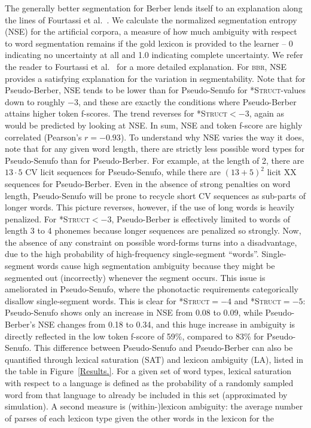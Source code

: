 \documentclass[11pt]{article}
\begin{document}
The generally better segmentation for Berber lends itself to an explanation along the lines of Fourtassi et al.~. We calculate the normalized segmentation entropy (NSE) for the artificial corpora, a measure of how much ambiguity with respect to word segmentation remains if the gold lexicon is provided to the learner -- 0 indicating no uncertainty at all and 1.0 indicating complete uncertainty. We refer the reader to Fourtassi et al.~ for a more detailed explanation. For \textsc{bbr}, NSE provides a satisfying explanation for the variation in segmentability. Note that for Pseudo-Berber, NSE tends to be lower than for Pseudo-Senufo for \textsc{*Struct}-values down to roughly $-3$, and these are exactly the conditions where Pseudo-Berber attains higher token f-scores. The trend reverses for \textsc{*Struct}$<-3$, again as would be predicted by looking at NSE. In sum, NSE and token f-score are highly correlated (Pearson's $r = -0.93$). To understand why NSE varies the way it does, note that for any given word length, there are strictly less possible word types for Pseudo-Senufo than for Pseudo-Berber. For example, at the length of 2, there are $13 \cdot 5$ CV licit sequences for Pseudo-Senufo, while there are $(13+5)^2$ licit XX sequences for Pseudo-Berber. Even in the absence of strong penalties on word length, Pseudo-Senufo will be prone to recycle short CV sequences as sub-parts of longer words. This picture reverses, however, if the use of long words is heavily penalized. For \textsc{*Struct}$< -3$, Pseudo-Berber is effectively limited to words of length 3 to 4 phonemes because longer sequences are penalized so strongly. Now, the absence of any constraint on possible word-forms turns into a disadvantage, due to the high probability of high-frequency single-segment ``words''. Single-segment words cause high segmentation ambiguity because they might be segmented out (incorrectly) whenever the segment occurs. This issue is ameliorated in Pseudo-Senufo, where the phonotactic requirements categorically disallow single-segment words. This is clear for \textsc{*Struct}$= -4$ and \textsc{*Struct}$= -5$: Pseudo-Senufo shows only an increase in NSE from 0.08 to 0.09, while Pseudo-Berber's NSE changes from 0.18 to 0.34, and this huge increase in ambiguity is directly reflected in the low token f-score of 59\%, compared to 83\% for Pseudo-Senufo. This difference between Pseudo-Senufo and Pseudo-Berber can also be quantified through lexical saturation (SAT) and lexicon ambiguity (LA), listed in the table in Figure~\ref{Results.}. For a given set of word types, lexical saturation with respect to a language is defined as the probability of a randomly sampled word from that language to already be included in this set (approximated by simulation). A second measure is (within-)lexicon ambiguity: the average number of parses of each lexicon type given the other words in the lexicon for the 
\end{document}
